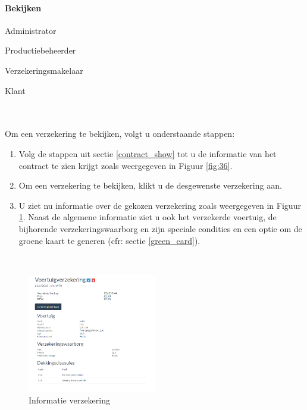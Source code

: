 \documentclass[11pt,openany]{article}
\newcommand{\cmark}{\ding{51}}%
\newcommand{\xmark}{\ding{55}}%
\newcommand{\done}{\rlap{$\square$}{\raisebox{2pt}{\large\hspace{1pt}\cmark}}%
	\hspace{-2.5pt}}
\newcommand{\wontfix}{\rlap{$\square$}{\large\hspace{1pt}\xmark}}
\begin{document}
\newpage
\paragraph{Bekijken}
\label{vehicle_insurance_show}
\begin{todolist}
	\item[\done] Administrator
	\item[\done] Productiebeheerder
	\item[\done] Verzekeringsmakelaar
	\item[\wontfix] Klant 
\end{todolist}
\\
\\
Om een verzekering te bekijken, volgt u onderstaande stappen:
\begin{enumerate}
		\item  Volg de stappen uit sectie \ref{contract_show} tot u de informatie van het contract te zien krijgt zoals weergegeven in Figuur \ref{fig:36}.
	\item Om een verzekering te bekijken, klikt u de desgewenste verzekering aan.
	\item U ziet nu informatie over de gekozen verzekering zoals weergegeven in Figuur \ref{fig:38}. 
	Naast de algemene informatie ziet u ook het verzekerde voertuig, de bijhorende verzekeringswaarborg en zijn speciale condities en een optie om de groene kaart te generen (cfr: sectie \ref{green_card}). 
\end{enumerate}
\
\begin{figure}
	\centering
	\includegraphics[width=0.5\textwidth]{img/fig38.png}
	\caption{Informatie verzekering} 
	\label{fig:38} 
\end{figure}
\newpage
\end{document}
